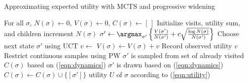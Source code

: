 %

\begin{algorithm}
\caption{Approximating expected utility with MCTS and progressive widening}
\label{algo:mcvts}
  \begin{algorithmic}[1]
    \State For all $\sigma$, $N(\sigma) \gets 0$, $V(\sigma) \gets 0$, $C(\sigma) \gets [\,]$
	\Comment Initialize visits, utility sum, and children
    \State increment $N(\sigma)$
    \State $\sigma' \gets \argmax_{\sigma'} \left\{\frac{V(\sigma')}{N(\sigma')} + c \sqrt{\frac{\log N(\sigma)}{N(\sigma')}} \right\}$
      \Comment Choose next state $\sigma'$ using UCT
	  \State $v \gets $
      \State $V(\sigma) \gets V(\sigma) + v$
	  \Comment Record observed utility
      \State \Return $v$
	  \Comment Restrict continuous samples using PW
        \State $\sigma'$ is sampled from set of already visited $C(\sigma)$ based on (\ref{eqn:dynamics})
	  \Else
        \State $\sigma'$ is drawn based on (\ref{eqn:dynamics})
        \State $C(\sigma) \gets C(\sigma) \cup \{ [\sigma'] \}$
	  \EndIf
      \State \Return {}
    \State \Return utility $U$ of $\sigma$ according to (\ref{eqn:utility})
    \EndIf
    \EndFunction{}
  \end{algorithmic}
\end{algorithm}

